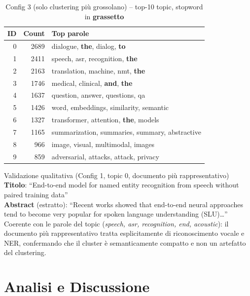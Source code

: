 \documentclass[12pt,a4paper]{article}
\begin{document}
\begin{table}[H]
  \centering
  \small
  \caption{Config 3 (solo clustering pi\`u grossolano) -- top-10 topic, stopword in \textbf{grassetto}}
  \begin{tabular}{rrl}
    \toprule
    \textbf{ID} & \textbf{Count} & \textbf{Top parole} \\
    \midrule
    0 & 2689 & dialogue, \textbf{the}, dialog, \textbf{to} \\
    1 & 2411 & speech, asr, recognition, \textbf{the} \\
    2 & 2163 & translation, machine, nmt, \textbf{the} \\
    3 & 1746 & medical, clinical, \textbf{and}, \textbf{the} \\
    4 & 1637 & question, answer, questions, qa \\
    5 & 1426 & word, embeddings, similarity, semantic \\
    6 & 1327 & transformer, attention, \textbf{the}, models \\
    7 & 1165 & summarization, summaries, summary, abstractive \\
    8 &  966 & image, visual, multimodal, images \\
    9 &  859 & adversarial, attacks, attack, privacy \\
    \bottomrule
  \end{tabular}
\end{table}

\begin{exbox}{Validazione qualitativa (Config 1, topic 0, documento pi\`u rappresentativo)}
\textbf{Titolo}: ``End-to-end model for named entity recognition from speech without paired training data''\\
\textbf{Abstract} (estratto): ``Recent works showed that end-to-end neural approaches tend to become very popular for spoken language understanding (SLU)\ldots''\\
Coerente con le parole del topic (\textit{speech, asr, recognition, end, acoustic}): il documento pi\`u rappresentativo tratta esplicitamente di riconoscimento vocale e NER, confermando che il cluster \`e semanticamente compatto e non un artefatto del clustering.
\end{exbox}

\section{Analisi e Discussione}
\end{document}
